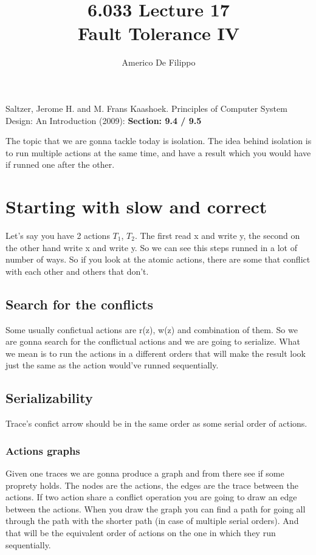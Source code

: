 \documentclass{article}
\title{6.033 Lecture 17 \\ Fault Tolerance IV}
\author{Americo De Filippo}
\begin{document}
 
  \maketitle
  \begin{thebibliography}{9}
    Saltzer, Jerome H. and M. Frans Kaashoek. Principles of Computer System Design: An Introduction (2009): \textbf{Section: 9.4 / 9.5}
  \end{thebibliography}
  \maketitle
  The topic that we are gonna tackle today is isolation. 
  The idea behind isolation is to run multiple actions at the same time, and have a result 
  which you would have if runned one after the other.
  \section{Starting with slow and correct}
    Let's say you have 2 actions $T_1$, $T_2$. The first read x and write y, the second on the
    other hand write x and write y. So we can see this steps runned in a lot of number of 
    ways. So if you look at the atomic actions, there are some that conflict with each other
    and others that don't. 
    \subsection{Search for the conflicts}
      Some usually confictual actions are r(z), w(z) and combination of them. So we are gonna 
      search for the conflictual actions and we are going to serialize. What we mean is to run
      the actions in a different orders that will make the result look just the same as the
      action would've runned sequentially.
    \subsection{Serializability}
      Trace's confict arrow should be in the same order as some serial order of actions.
      \subsubsection{Actions graphs}
        Given one traces we are gonna produce a graph and from there see if some proprety 
        holds. The nodes are the actions, the edges are the trace between the actions. If 
        two action share a conflict operation you are going to draw an edge between 
        the actions. When you draw the graph you can find a path for going all through 
        the path with the shorter path (in case of multiple serial orders). And that will 
        be the equivalent order of actions on the one in which they run sequentially.
\end{document}
